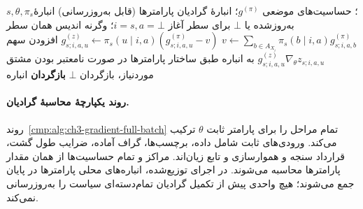 \begin{algorithm}[!htbp]
\caption{زیرروال $\operatorname{PolicyPullback}$: انباشت مشتق پارامترهای سیاست}
\label{cmp:alg:ch3-gradient-policy-pullback}
\begin{algorithmic}[1]
\REQUIRE $s,\theta,\pi_s$؛ حساسیت‌های موضعی $g^{(\pi)}$؛
انبارهٔ گرادیان پارامترها (قابل به‌روزرسانی)
\ENSURE انبارهٔ به‌روزشده یا $\bot$
    \STATE برای سطر آغاز $i=s,a=\bot$؛ وگرنه اندیس همان سطر
    \STATE $v\gets\sum_{b\in A_{X_i}}\pi_s(b\mid i,a)g_{s;i,a,b}^{(\pi)}$
        \STATE $g_{s;i,a,u}^{(z)}\gets
        \pi_s(u\mid i,a)(g_{s;i,a,u}^{(\pi)}-v)$
            \STATE افزودن سهم $g_{s;i,a,u}^{(z)}\nabla_\theta z_{s;i,a,u}$
            به انباره طبق ساختار پارامترها
        \ENDIF
    \ENDFOR
\ENDFOR
\STATE در صورت نامعتبر بودن مشتق موردنیاز، بازگردان $\bot$
\STATE \textbf{بازگردان} انباره
\end{algorithmic}
\end{algorithm}

\paragraph{روند یکپارچهٔ محاسبهٔ گرادیان.}
روند~\ref{cmp:alg:ch3-gradient-full-batch}
تمام مراحل را برای پارامتر ثابت $\theta$
ترکیب می‌کند. ورودی‌های ثابت شامل داده،
برچسب‌ها، گراف آماده، ضرایب طول گشت،
قرارداد سنجه و هموارسازی و تابع زیان‌اند.
مراکز و تمام حساسیت‌ها از همان مقدار
پارامترها محاسبه می‌شوند. در اجرای
توزیع‌شده، انباره‌های محلی پارامترها
در پایان جمع می‌شوند؛ هیچ واحدی پیش
از تکمیل گرادیان تمام‌دسته‌ای سیاست را
به‌روزرسانی نمی‌کند.

